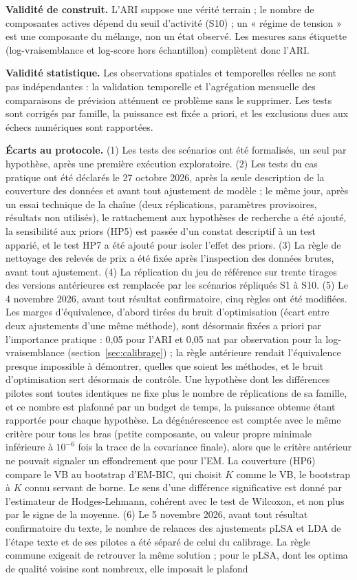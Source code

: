 \textbf{Validité de construit. }L'ARI suppose une vérité terrain ; le nombre de composantes actives dépend du seuil d'activité (S10) ; un « régime de tension » est une composante du mélange, non un état observé. Les mesures sans étiquette (log-vraisemblance et log-score hors échantillon) complètent donc l'ARI.

\textbf{Validité statistique. }Les observations spatiales et temporelles réelles ne sont pas indépendantes : la validation temporelle et l'agrégation mensuelle des comparaisons de prévision atténuent ce problème sans le supprimer. Les tests sont corrigés par famille, la puissance est fixée a priori, et les exclusions dues aux échecs numériques sont rapportées.

\textbf{Écarts au protocole.} (1) Les tests des scénarios ont été formalisés, un seul par hypothèse, après une première exécution exploratoire. (2) Les tests du cas pratique ont été déclarés le 27 octobre 2026, après la seule description de la couverture des données et avant tout ajustement de modèle ; le même jour, après un essai technique de la chaîne (deux réplications, paramètres provisoires, résultats non utilisés), le rattachement aux hypothèses de recherche a été ajouté, la sensibilité aux priors (HP5) est passée d'un constat descriptif à un test apparié, et le test HP7 a été ajouté pour isoler l'effet des priors. (3) La règle de nettoyage des relevés de prix a été fixée après l'inspection des données brutes, avant tout ajustement. (4) La réplication du jeu de référence sur trente tirages des versions antérieures est remplacée par les scénarios répliqués S1 à S10. (5) Le 4 novembre 2026, avant tout résultat confirmatoire, cinq règles ont été modifiées. Les marges d'équivalence, d'abord tirées du bruit d'optimisation (écart entre deux ajustements d'une même méthode), sont désormais fixées a priori par l'importance pratique : 0,05 pour l'ARI et 0,05 nat par observation pour la log-vraisemblance (section~\ref{sec:calibrage}) ; la règle antérieure rendait l'équivalence presque impossible à démontrer, quelles que soient les méthodes, et le bruit d'optimisation sert désormais de contrôle. Une hypothèse dont les différences pilotes sont toutes identiques ne fixe plus le nombre de réplications de sa famille, et ce nombre est plafonné par un budget de temps, la puissance obtenue étant rapportée pour chaque hypothèse. La dégénérescence est comptée avec le même critère pour tous les bras (petite composante, ou valeur propre minimale inférieure à $10^{-6}$ fois la trace de la covariance finale), alors que le critère antérieur ne pouvait signaler un effondrement que pour l'EM. La couverture (HP6) compare le VB au bootstrap d'EM-BIC, qui choisit $K$ comme le VB, le bootstrap à $K$ connu servant de borne. Le sens d'une différence significative est donné par l'estimateur de Hodges-Lehmann, cohérent avec le test de Wilcoxon, et non plus par le signe de la moyenne. (6) Le 5 novembre 2026, avant tout résultat confirmatoire du texte, le nombre de relances des ajustements pLSA et LDA de l'étape texte et de ses pilotes a été séparé de celui du calibrage. La règle commune exigeait de retrouver la même solution ; pour le pLSA, dont les optima de qualité voisine sont nombreux, elle imposait le plafond 
